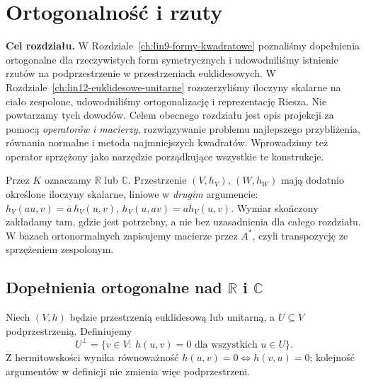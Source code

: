 \chapter{Ortogonalność i rzuty}
\label{ch:lin13-ortogonalnosc-rzuty}

\providecommand{\atlasref}[2]{#2}

\noindent\textbf{Cel rozdziału.}
W Rozdziale~\ref{ch:lin9-formy-kwadratowe}
poznaliśmy dopełnienia ortogonalne dla rzeczywistych
form symetrycznych i udowodniliśmy istnienie rzutów
na podprzestrzenie w przestrzeniach euklidesowych.
W Rozdziale~\ref{ch:lin12-euklidesowe-unitarne}
rozszerzyliśmy iloczyny skalarne na ciało zespolone,
udowodniliśmy ortogonalizację i reprezentację Riesza.
Nie powtarzamy tych dowodów.
Celem obecnego rozdziału jest opis projekcji za pomocą
\emph{operatorów i macierzy}, rozwiązywanie problemu
najlepszego przybliżenia, równania normalne i
metoda najmniejszych kwadratów.
Wprowadzimy też operator sprzężony jako narzędzie
porządkujące wszystkie te konstrukcje.

Przez \(K\) oznaczamy \(\mathbb R\) lub \(\mathbb C\).
Przestrzenie \((V,h_V)\), \((W,h_W)\)
mają dodatnio określone iloczyny skalarne,
liniowe w \emph{drugim} argumencie:
\(h_V(au,v)=\overline a\,h_V(u,v)\),
\(h_V(u,av)=a h_V(u,v)\).
Wymiar skończony zakładamy tam, gdzie jest potrzebny,
a nie bez uzasadnienia dla całego rozdziału.
W bazach ortonormalnych zapisujemy macierze
przez \(A^*\), czyli transpozycję ze sprzężeniem zespolonym.

\section{Dopełnienia ortogonalne nad \texorpdfstring{\(\mathbb R\)}{R} i \texorpdfstring{\(\mathbb C\)}{C}}
\label{sec:lin13-dopelnienia}

\begin{definicja}
\label{def:lin13-dopelnienie}
Niech \((V,h)\) będzie przestrzenią euklidesową
lub unitarną, a \(U\subseteq V\) podprzestrzenią.
Definiujemy
\[
 U^\perp=\{v\in V:\ h(u,v)=0
                     \text{ dla wszystkich }u\in U\}.
\]
Z hermitowskości wynika równoważność
\(h(u,v)=0\iff h(v,u)=0\);
kolejność argumentów w definicji
nie zmienia więc podprzestrzeni.
\end{definicja}


